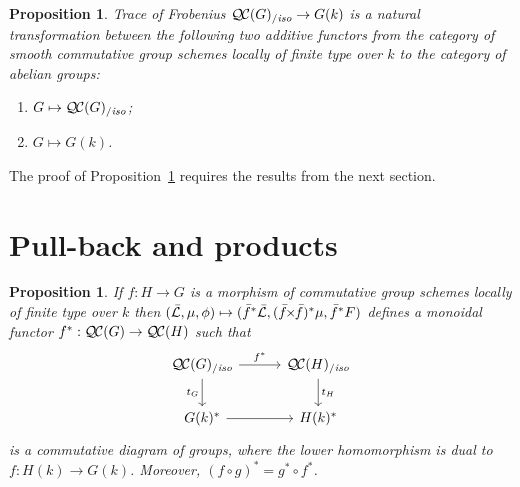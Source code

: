 \documentclass[11pt]{amsart}
\theoremstyle{plain}
\newtheorem{proposition}[theorem]{Proposition}
\theoremstyle{definition}
\theoremstyle{remark}
\newcommand{\EE}{\mathbb{\bar Q}_\ell}
\newcommand{\Fq}{k}
\newcommand{\EEx}{\EE^\times}
\DeclareMathOperator{\Hom}{Hom}
\newcommand{\gcs}[1]{{\mathcal{\bar #1}}}
\newcommand{\QC}{{\mathcal{Q\hskip-0.8pt C}}}
\newcommand{\QCiso}[1]{\QC(#1)_{/\textit{iso}}}
\newcommand{\trFrob}[1]{t_{#1}}
\renewcommand{\bf}{\bar{f}}
\newcommand{\tight}[3]{\hspace{-#1pt}{#2}\hspace{-#3pt}}
\newcommand{\bfxf}{\text{$\bar{f} \tight{1}{\times}{1} \bar{f}$}}
\begin{document}
\begin{proposition}\label{prop:functorialG}
Trace of Frobenius $\QCiso{G} \to G(\Fq)$ is a natural transformation 
between the following two additive functors from the category of smooth commutative
group schemes locally of finite type over $\Fq$ to the category of abelian groups:
\begin{enumerate}
\item[$F_1$:] $G \mapsto \QCiso{G}$;
\item[$F_2$:] $G \mapsto G(\Fq)$.
\end{enumerate}
\end{proposition}

The proof of Proposition~\ref{prop:functorialG} requires the results from the next section.

\section{Pull-back and products}\label{sec:pullback}

\begin{proposition}\label{prop:pullback}
  If $f : H\to G$ is a morphism of commutative group schemes locally of finite type over $\Fq$ then
  $(\gcs{L},\mu,\phi) \mapsto (\bf^*\gcs{L},(\bfxf)^*\mu,\bf^*F)$
  defines a monoidal functor $f^* : \QC(G) \to \QC(H)$ such that
  \[
  \begin{tikzcd}[row sep=20, column sep=30]
   \QCiso{G} \rar{f^*} \arrow[swap]{d}{\trFrob{G}} & \QCiso{H} \dar{\trFrob{H}} \\
   G(\Fq)^* \rar & H(\Fq)^*
  \end{tikzcd}
  \]
  is a commutative diagram of groups, where the lower homomorphism is
  dual to $f : H(\Fq)\to G(\Fq)$.  Moreover, $(f\circ g)^* = g^* \circ f^*$.
\end{proposition}
\end{document}
